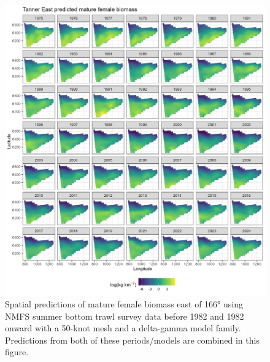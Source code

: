 \documentclass[
]{article}
\begin{document}
\begin{figure}

{\centering \includegraphics[width=1\linewidth,height=1\textheight]{../BAIRDI/Figures/TannerE_matfem_spatbio} 

}

\caption{Spatial predictions of mature female biomass east of 166° using NMFS summer bottom trawl survey data before 1982 and 1982 onward with a 50-knot mesh and a delta-gamma model family. Predictions from both of these periods/models are combined in this figure.}\label{fig:spatpred-bio-50-matfemE}
\end{figure}
\end{document}
